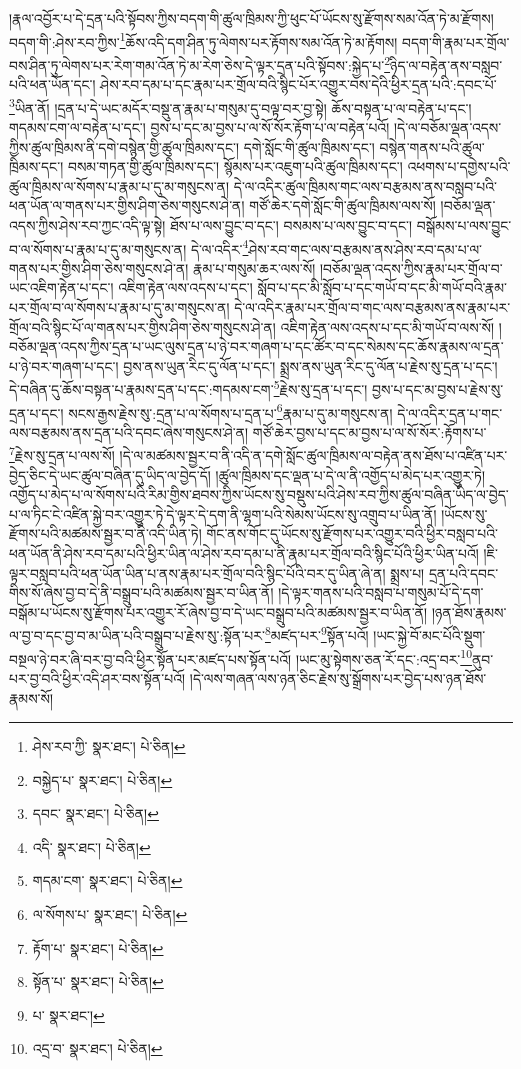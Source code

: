 །རྣལ་འབྱོར་པ་དེ་དྲན་པའི་སྟོབས་ཀྱིས་བདག་གི་ཚུལ་ཁྲིམས་ཀྱི་ཕུང་པོ་ཡོངས་སུ་རྫོགས་སམ་འོན་ཏེ་མ་རྫོགས། བདག་གི་:ཤེས་རབ་ཀྱིས་\footnote{ཤེས་རབ་ཀྱི་  སྣར་ཐང་།  པེ་ཅིན། }ཆོས་འདི་དག་ཤིན་ཏུ་ལེགས་པར་རྟོགས་སམ་འོན་ཏེ་མ་རྟོགས། བདག་གི་རྣམ་པར་གྲོལ་བས་ཤིན་ཏུ་ལེགས་པར་རེག་གམ་འོན་ཏེ་མ་རེག་ཅེས་དེ་ལྟར་དྲན་པའི་སྟོབས་:སྐྱེད་པ་\footnote{བསྐྱེད་པ་  སྣར་ཐང་།  པེ་ཅིན། }ཉིད་ལ་བརྟེན་ནས་བསླབ་པའི་ཕན་ཡོན་དང་། ཤེས་རབ་དམ་པ་དང་རྣམ་པར་གྲོལ་བའི་སྙིང་པོར་འགྱུར་བས་དེའི་ཕྱིར་དྲན་པའི་:དབང་པོ་\footnote{དབང་  སྣར་ཐང་།  པེ་ཅིན། }ཡིན་ནོ། །དྲན་པ་དེ་ཡང་མདོར་བསྡུ་ན་རྣམ་པ་གསུམ་དུ་བལྟ་བར་བྱ་སྟེ། ཆོས་བསྟན་པ་ལ་བརྟེན་པ་དང་། གདམས་ངག་ལ་བརྟེན་པ་དང་། བྱས་པ་དང་མ་བྱས་པ་ལ་སོ་སོར་རྟོག་པ་ལ་བརྟེན་པའོ། །དེ་ལ་བཅོམ་ལྡན་འདས་ཀྱིས་ཚུལ་ཁྲིམས་ནི་དགེ་བསྙེན་གྱི་ཚུལ་ཁྲིམས་དང་། དགེ་སློང་གི་ཚུལ་ཁྲིམས་དང་། བསྙེན་གནས་པའི་ཚུལ་ཁྲིམས་དང་། བསམ་གཏན་གྱི་ཚུལ་ཁྲིམས་དང་། སྙོམས་པར་འཇུག་པའི་ཚུལ་ཁྲིམས་དང་། འཕགས་པ་དགྱེས་པའི་ཚུལ་ཁྲིམས་ལ་སོགས་པ་རྣམ་པ་དུ་མ་གསུངས་ན། དེ་ལ་འདིར་ཚུལ་ཁྲིམས་གང་ལས་བརྩམས་ནས་བསླབ་པའི་ཕན་ཡོན་ལ་གནས་པར་གྱིས་ཤིག་ཅེས་གསུངས་ཤེ་ན། གཙོ་ཆེར་དགེ་སློང་གི་ཚུལ་ཁྲིམས་ལས་སོ། །བཅོམ་ལྡན་འདས་ཀྱིས་ཤེས་རབ་ཀྱང་འདི་ལྟ་སྟེ། ཐོས་པ་ལས་བྱུང་བ་དང་། བསམས་པ་ལས་བྱུང་བ་དང་། བསྒོམས་པ་ལས་བྱུང་བ་ལ་སོགས་པ་རྣམ་པ་དུ་མ་གསུངས་ན། དེ་ལ་འདིར་\footnote{འདི་  སྣར་ཐང་།  པེ་ཅིན། }ཤེས་རབ་གང་ལས་བརྩམས་ནས་ཤེས་རབ་དམ་པ་ལ་གནས་པར་གྱིས་ཤིག་ཅེས་གསུངས་ཤེ་ན། རྣམ་པ་གསུམ་ཆར་ལས་སོ། །བཅོམ་ལྡན་འདས་ཀྱིས་རྣམ་པར་གྲོལ་བ་ཡང་འཇིག་རྟེན་པ་དང་། འཇིག་རྟེན་ལས་འདས་པ་དང་། སློབ་པ་དང་མི་སློབ་པ་དང་གཡོ་བ་དང་མི་གཡོ་བའི་རྣམ་པར་གྲོལ་བ་ལ་སོགས་པ་རྣམ་པ་དུ་མ་གསུངས་ན། དེ་ལ་འདིར་རྣམ་པར་གྲོལ་བ་གང་ལས་བརྩམས་ནས་རྣམ་པར་གྲོལ་བའི་སྙིང་པོ་ལ་གནས་པར་གྱིས་ཤིག་ཅེས་གསུངས་ཤེ་ན། འཇིག་རྟེན་ལས་འདས་པ་དང་མི་གཡོ་བ་ལས་སོ། །བཅོམ་ལྡན་འདས་ཀྱིས་དྲན་པ་ཡང་ལུས་དྲན་པ་ཉེ་བར་གཞག་པ་དང་ཚོར་བ་དང་སེམས་དང་ཆོས་རྣམས་ལ་དྲན་པ་ཉེ་བར་གཞག་པ་དང་། བྱས་ནས་ཡུན་རིང་དུ་ལོན་པ་དང་། སྨྲས་ནས་ཡུན་རིང་དུ་ལོན་པ་རྗེས་སུ་དྲན་པ་དང་། དེ་བཞིན་དུ་ཆོས་བསྟན་པ་རྣམས་དྲན་པ་དང་:གདམས་ངག་\footnote{གདམ་ངག་  སྣར་ཐང་།  པེ་ཅིན། }རྗེས་སུ་དྲན་པ་དང་། བྱས་པ་དང་མ་བྱས་པ་རྗེས་སུ་དྲན་པ་དང་། སངས་རྒྱས་རྗེས་སུ་:དྲན་པ་ལ་སོགས་པ་དྲན་པ་\footnote{ལ་སོགས་པ་  སྣར་ཐང་།  པེ་ཅིན། }རྣམ་པ་དུ་མ་གསུངས་ན། དེ་ལ་འདིར་དྲན་པ་གང་ལས་བརྩམས་ནས་དྲན་པའི་དབང་ཞེས་གསུངས་ཤེ་ན། གཙོ་ཆེར་བྱས་པ་དང་མ་བྱས་པ་ལ་སོ་སོར་:རྟོགས་པ་\footnote{རྟོག་པ་  སྣར་ཐང་།  པེ་ཅིན། }རྗེས་སུ་དྲན་པ་ལས་སོ། །དེ་ལ་མཚམས་སྦྱར་བ་ནི་འདི་ན་དགེ་སློང་ཚུལ་ཁྲིམས་ལ་བརྟེན་ནས་ཐོས་པ་འཛིན་པར་བྱེད་ཅིང་དེ་ཡང་ཚུལ་བཞིན་དུ་ཡིད་ལ་བྱེད་དོ། །ཚུལ་ཁྲིམས་དང་ལྡན་པ་དེ་ལ་ནི་འགྱོད་པ་མེད་པར་འགྱུར་ཏེ། འགྱོད་པ་མེད་པ་ལ་སོགས་པའི་རིམ་གྱིས་ཐབས་ཀྱིས་ཡོངས་སུ་བསྡུས་པའི་ཤེས་རབ་ཀྱིས་ཚུལ་བཞིན་ཡིད་ལ་བྱེད་པ་ལ་ཏིང་ངེ་འཛིན་སྐྱེ་བར་འགྱུར་ཏེ་དེ་ལྟར་དེ་དག་ནི་ལྷག་པའི་སེམས་ཡོངས་སུ་འགྲུབ་པ་ཡིན་ནོ། །ཡོངས་སུ་རྫོགས་པའི་མཚམས་སྦྱར་བ་ནི་འདི་ཡིན་ཏེ། གོང་ནས་གོང་དུ་ཡོངས་སུ་རྫོགས་པར་འགྱུར་བའི་ཕྱིར་བསླབ་པའི་ཕན་ཡོན་ནི་ཤེས་རབ་དམ་པའི་ཕྱིར་ཡིན་ལ་ཤེས་རབ་དམ་པ་ནི་རྣམ་པར་གྲོལ་བའི་སྙིང་པོའི་ཕྱིར་ཡིན་པའོ། །ཇི་ལྟར་བསླབ་པའི་ཕན་ཡོན་ཡིན་པ་ནས་རྣམ་པར་གྲོལ་བའི་སྙིང་པོའི་བར་དུ་ཡིན་ཞེ་ན། སྨྲས་པ། དྲན་པའི་དབང་གིས་སོ་ཞེས་བྱ་བ་དེ་ནི་བསྒྲུབ་པའི་མཚམས་སྦྱར་བ་ཡིན་ནོ། །དེ་ལྟར་གནས་པའི་བསླབ་པ་གསུམ་པོ་དེ་དག་བསྒོམ་པ་ཡོངས་སུ་རྫོགས་པར་འགྱུར་རོ་ཞེས་བྱ་བ་དེ་ཡང་བསྒྲུབ་པའི་མཚམས་སྦྱར་བ་ཡིན་ནོ། །ཉན་ཐོས་རྣམས་ལ་བྱ་བ་དང་བྱ་བ་མ་ཡིན་པའི་བསྒྲུབ་པ་རྗེས་སུ་:སྟོན་པར་\footnote{སྟོན་པ་  སྣར་ཐང་།  པེ་ཅིན། }མཛད་པར་\footnote{པ་  སྣར་ཐང་། }སྟོན་པའོ། །ཡང་སྐྱེ་བོ་མང་པོའི་སྡུག་བསྔལ་ཉེ་བར་ཞི་བར་བྱ་བའི་ཕྱིར་སྟོན་པར་མཛད་པས་སྟོན་པའོ། །ཡང་མུ་སྟེགས་ཅན་རོ་དང་:འདྲ་བར་\footnote{འདྲ་བ་  སྣར་ཐང་།  པེ་ཅིན། }ནུབ་པར་བྱ་བའི་ཕྱིར་འདི་ཤར་བས་སྟོན་པའོ། །དེ་ལས་གཞན་ལས་ཉན་ཅིང་རྗེས་སུ་སྒྲོགས་པར་བྱེད་པས་ཉན་ཐོས་རྣམས་སོ། 